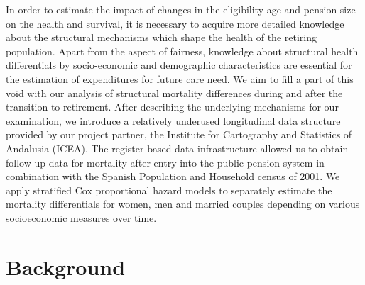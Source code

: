 \documentclass[a4paper,10pt,oneside,english]{article}
\begin{document}
In order to estimate the impact of changes in the eligibility age and pension size on the health and survival, it is necessary to acquire more detailed knowledge about the structural mechanisms which shape the health of the retiring population. Apart from the aspect of fairness, knowledge about structural health differentials by socio-economic and demographic characteristics are essential for the estimation of expenditures for future care need. We aim to fill a part of this void with our analysis of structural mortality differences during and after the transition to retirement. After describing the underlying mechanisms for our examination, we introduce a relatively underused longitudinal data structure provided by our project partner, the Institute for Cartography and Statistics of Andalusia (ICEA). The register-based data infrastructure allowed us to obtain follow-up data for mortality after entry into the public pension system in combination with the Spanish Population and Household census of 2001. We apply stratified Cox proportional hazard models to separately estimate the mortality differentials for women, men and married couples depending on various socioeconomic measures over time. 


\section*{\textsf{Background}}
\end{document}
